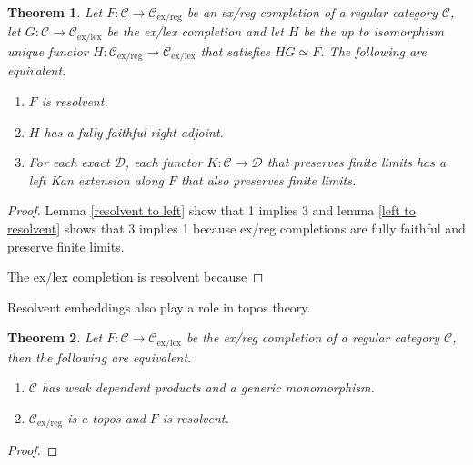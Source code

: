 \documentclass[sort&compress]{elsarticle}
\theoremstyle{plain}
\newtheorem{theorem}{Theorem}
\theoremstyle{definition}
\theoremstyle{remark}
\newcommand\hide[1]{}
\newcommand\cat\mathcal
\newcommand\exlex{_\mathrm{ex/lex}}\newcommand\exreg{_\mathrm{ex/reg}}
\newcommand\of:
\begin{document}
\begin{theorem} Let $F:\cat C\to\cat C\exreg$ be an ex/reg completion of a regular category $\cat C$, let $G\of \cat C \to \cat C\exlex$ be the ex/lex completion and let $H$ be the up to isomorphism unique functor $H\of\cat C\exreg \to \cat C\exlex$ that satisfies $HG\simeq F$. 
The following are equivalent.
\begin{enumerate}
\item $F$ is resolvent.
\item $H$ has a fully faithful right adjoint.
\item For each exact $\cat D$, each functor $K\of \cat C \to \cat D$ that preserves finite limits has a left Kan extension along $F$ that also preserves finite limits.
\end{enumerate}
\end{theorem}

\begin{proof} Lemma \ref{resolvent to left} show that 1 implies 3 and lemma \ref{left to resolvent} shows that 3 implies 1 because ex/reg completions are fully faithful and preserve finite limits.



The ex/lex completion is resolvent because %


\hide{Point ahead to lemmas down this paper

ThA -> LKE,converse,adjunct
adjunct -> LKE


ThB -> lccc, closubclass, ...


}
\end{proof}

Resolvent embeddings also play a role in topos theory.

\begin{theorem} Let $F:\cat C\to\cat C\exlex$ be the ex/reg completion of a regular category $\cat C$, then the following are equivalent.
\begin{enumerate}
\item $\cat C$ has \emph{weak dependent products} and a \emph{generic monomorphism}. \hide{these need to be defined somewhere}
\item $\cat C\exreg$ is a topos and $F$ is resolvent. 
\end{enumerate}
\end{theorem}

\begin{proof}
\hide{Point ahead to lemmas down this paper}
\end{proof}
\end{document}

